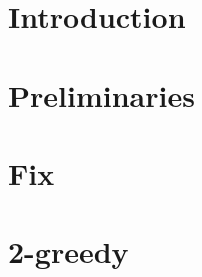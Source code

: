 \begin{abstract}

\end{abstract}

\section{Introduction}


\section{Preliminaries}


\section{Fix}


\section{2-greedy}


